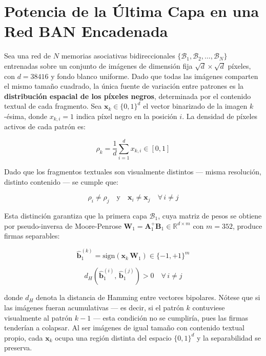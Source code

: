 \documentclass[12pt]{article}
\begin{document}
\section*{Potencia de la Última Capa en una Red BAN Encadenada}

Sea una red de $N$ memorias asociativas bidireccionales $\{\mathcal{B}_1, \mathcal{B}_2, \dots, \mathcal{B}_N\}$
entrenadas sobre un conjunto de imágenes de dimensión fija $\sqrt{d} \times \sqrt{d}$ píxeles,
con $d = 38416$ y fondo blanco uniforme. Dado que todas las imágenes comparten el mismo tamaño
cuadrado, la única fuente de variación entre patrones es la \textbf{distribución espacial de los
	píxeles negros}, determinada por el contenido textual de cada fragmento. Sea $\mathbf{x}_k \in \{0,1\}^{d}$
el vector binarizado de la imagen $k$-ésima, donde $x_{k,i} = 1$ indica píxel negro en la posición $i$.
La densidad de píxeles activos de cada patrón es:

\begin{equation}
	\rho_k = \frac{1}{d} \sum_{i=1}^{d} x_{k,i} \in [0, 1]
\end{equation}

Dado que los fragmentos textuales son visualmente distintos — misma resolución, distinto contenido —
se cumple que:

\begin{equation}
	\rho_i \neq \rho_j \quad \text{y} \quad
	\mathbf{x}_i \neq \mathbf{x}_j \quad \forall\, i \neq j
\end{equation}

Esta distinción garantiza que la primera capa $\mathcal{B}_1$, cuya matriz de pesos se obtiene por
pseudo-inversa de Moore-Penrose $\mathbf{W}_1 = \mathbf{A}_1^{+} \mathbf{B}_1 \in \mathbb{R}^{d \times m}$
con $m = 352$, produce firmas separables:

\begin{equation}
	\hat{\mathbf{b}}_1^{(k)} = \text{sign}\!\left(\mathbf{x}_k \, \mathbf{W}_1\right)
	\in \{-1, +1\}^{m}
\end{equation}

\begin{equation}
	d_H\!\left(\hat{\mathbf{b}}_1^{(i)},\, \hat{\mathbf{b}}_1^{(j)}\right) > 0
	\quad \forall\, i \neq j
\end{equation}

donde $d_H$ denota la distancia de Hamming entre vectores bipolares. Nótese que si las imágenes
fueran acumulativas — es decir, si el patrón $k$ contuviese visualmente al patrón $k-1$ — esta
condición no se cumpliría, pues las firmas tenderían a colapsar. Al ser imágenes de igual tamaño
con contenido textual propio, cada $\mathbf{x}_k$ ocupa una región distinta del espacio $\{0,1\}^d$
y la separabilidad se preserva.
\end{document}
